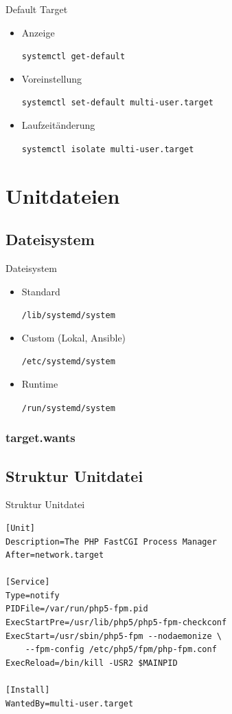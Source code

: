 \begin{frame}[fragile]{Default Target}
  \begin{itemize}
    \item Anzeige

    \verb|systemctl get-default|

    \item Voreinstellung

    \verb|systemctl set-default multi-user.target|

    \item Laufzeitänderung

    \verb|systemctl isolate multi-user.target|
  \end{itemize}
\end{frame}

\section{Unitdateien}

\subsection{Dateisystem}

\begin{frame}[fragile]{Dateisystem}
  \begin{itemize}
\item Standard

	\verb|/lib/systemd/system|
\item Custom (Lokal, Ansible)

	\verb|/etc/systemd/system|

\item Runtime

	\verb|/run/systemd/system|
\end{itemize}
\end{frame}

\subsubsection{target.wants}

\subsection{Struktur Unitdatei}

\begin{frame}[fragile]{Struktur Unitdatei}
 \begin{lstlisting}
[Unit]
Description=The PHP FastCGI Process Manager
After=network.target

[Service]
Type=notify
PIDFile=/var/run/php5-fpm.pid
ExecStartPre=/usr/lib/php5/php5-fpm-checkconf
ExecStart=/usr/sbin/php5-fpm --nodaemonize \
    --fpm-config /etc/php5/fpm/php-fpm.conf
ExecReload=/bin/kill -USR2 $MAINPID

[Install]
WantedBy=multi-user.target
\end{lstlisting}
\end{frame}

